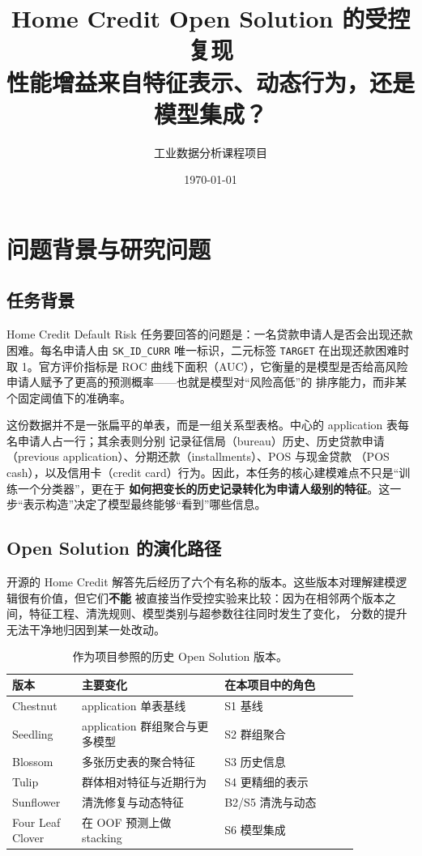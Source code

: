 \documentclass[11pt,UTF8,fontset=windows]{ctexrep}
\title{Home Credit Open Solution 的受控复现\\[4pt]
\large 性能增益来自特征表示、动态行为，还是模型集成？}
\author{工业数据分析课程项目}
\date{\today}
\begin{document}
\maketitle
\clearpage
{}

\chapter{问题背景与研究问题}

\section{任务背景}

Home Credit Default Risk 任务要回答的问题是：一名贷款申请人是否会出现还款困难。每名申请人由
\texttt{SK\_ID\_CURR} 唯一标识，二元标签 \texttt{TARGET} 在出现还款困难时取 1。官方评价指标是 ROC
曲线下面积（AUC），它衡量的是模型是否给高风险申请人赋予了更高的预测概率——也就是模型对“风险高低”的
排序能力，而非某个固定阈值下的准确率。

这份数据并不是一张扁平的单表，而是一组关系型表格。中心的 application 表每名申请人占一行；其余表则分别
记录征信局（bureau）历史、历史贷款申请（previous application）、分期还款（installments）、POS 与现金贷款
（POS cash），以及信用卡（credit card）行为。因此，本任务的核心建模难点不只是“训练一个分类器”，更在于
\textbf{如何把变长的历史记录转化为申请人级别的特征}。这一步“表示构造”决定了模型最终能够“看到”哪些信息。

\section{Open Solution 的演化路径}

开源的 Home Credit 解答先后经历了六个有名称的版本。这些版本对理解建模逻辑很有价值，但它们\textbf{不能}
被直接当作受控实验来比较：因为在相邻两个版本之间，特征工程、清洗规则、模型类别与超参数往往同时发生了变化，
分数的提升无法干净地归因到某一处改动。

\begin{table}[h]
\centering
\caption{作为项目参照的历史 Open Solution 版本。}
\label{tab:open-solution}
\begin{tabular}{p{0.17\linewidth}p{0.35\linewidth}p{0.33\linewidth}}
\toprule
版本 & 主要变化 & 在本项目中的角色 \\
\midrule
Chestnut & application 单表基线 & S1 基线 \\
Seedling & application 群组聚合与更多模型 & S2 群组聚合 \\
Blossom & 多张历史表的聚合特征 & S3 历史信息 \\
Tulip & 群体相对特征与近期行为 & S4 更精细的表示 \\
Sunflower & 清洗修复与动态特征 & B2/S5 清洗与动态 \\
Four Leaf Clover & 在 OOF 预测上做 stacking & S6 模型集成 \\
\bottomrule
\end{tabular}
\end{table}
\end{document}
